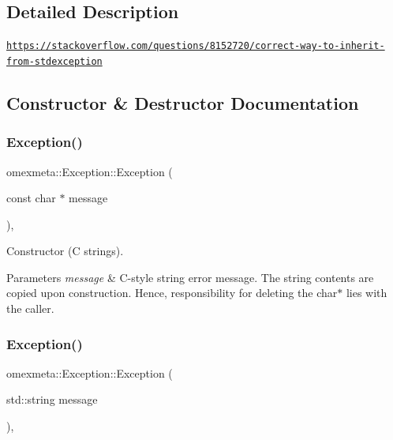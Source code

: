 \subsection{Detailed Description}
\href{https://stackoverflow.com/questions/8152720/correct-way-to-inherit-from-stdexception}{\tt https\+://stackoverflow.\+com/questions/8152720/correct-\/way-\/to-\/inherit-\/from-\/stdexception} 

\subsection{Constructor \& Destructor Documentation}
\mbox{\label{classomexmeta_1_1Exception_ad09e2a190a245199974678e2790e81ff}} 
\subsubsection{\texorpdfstring{Exception()}{Exception()}\hspace{0.1cm}{\footnotesize\ttfamily [1/2]}}
{\footnotesize\ttfamily omexmeta\+::\+Exception\+::\+Exception (\begin{DoxyParamCaption}\item[{const char $\ast$}]{message }\end{DoxyParamCaption})\hspace{0.3cm}{\ttfamily [inline]}, {\ttfamily [explicit]}}

Constructor (C strings). 
\begin{DoxyParams}{Parameters}
{\em message} & C-\/style string error message. The string contents are copied upon construction. Hence, responsibility for deleting the char$\ast$ lies with the caller. \\
\hline
\end{DoxyParams}
\mbox{\label{classomexmeta_1_1Exception_ac50b0a25504303cc1a4a1a20de0127eb}} 
\subsubsection{\texorpdfstring{Exception()}{Exception()}\hspace{0.1cm}{\footnotesize\ttfamily [2/2]}}
{\footnotesize\ttfamily omexmeta\+::\+Exception\+::\+Exception (\begin{DoxyParamCaption}\item[{std\+::string}]{message }\end{DoxyParamCaption})\hspace{0.3cm}{\ttfamily [inline]}, {\ttfamily [explicit]}}

